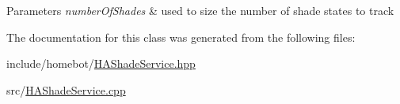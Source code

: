 \begin{DoxyParams}{Parameters}
{\em number\-Of\-Shades} & used to size the number of shade states to track \\
\hline
\end{DoxyParams}


The documentation for this class was generated from the following files\-:\begin{DoxyCompactItemize}
\item 
include/homebot/\hyperlink{HAShadeService_8hpp}{H\-A\-Shade\-Service.\-hpp}\item 
src/\hyperlink{HAShadeService_8cpp}{H\-A\-Shade\-Service.\-cpp}\end{DoxyCompactItemize}
